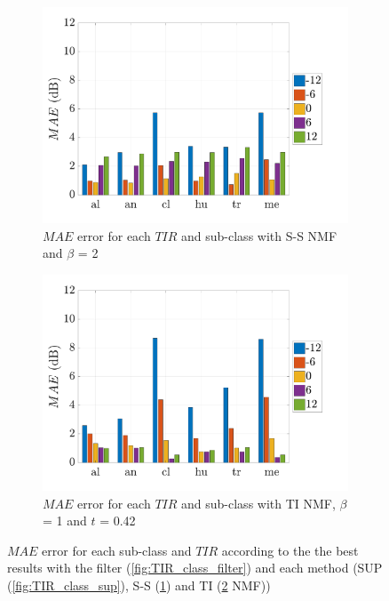 \documentclass[twocolumn,a4paper,10pt]{article}
\begin{document}
\begin{figure}[t]
    \begin{subfigure}[t]{0.45\textwidth}
        \centering
      	\includegraphics[width=\linewidth]{figures/semi-sup_bar.pdf}
        \caption{$MAE$ error for each $TIR$ and sub-class with S-S NMF and $\beta$ = 2}
                \label{fig:TIR_class_semi}
    \end{subfigure}%
    \hfill
    \begin{subfigure}[t]{0.45\textwidth}
        \centering
        \includegraphics[width=\linewidth]{figures/TI_bar}
        \caption{$MAE$ error for each $TIR$ and sub-class with TI NMF, $\beta$ = 1 and $t$ = 0.42}
        \label{fig:TIR_class_TI}
    \end{subfigure}
    \caption{$MAE$ error for each sub-class and $TIR$ according to the the best results with the filter (\ref{fig:TIR_class_filter}) and each method (SUP (\ref{fig:TIR_class_sup}), S-S (\ref{fig:TIR_class_semi}) and TI (\ref{fig:TIR_class_TI} NMF))}
    \label{fig:TIR_bar}
\end{figure}
\end{document}
